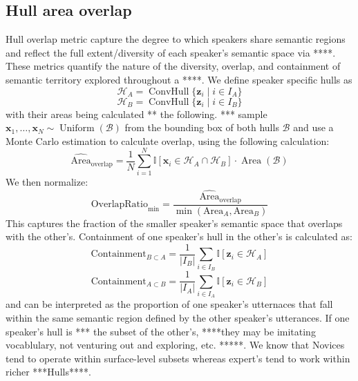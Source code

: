 \documentclass{article}
\theoremstyle{definition}
\numberwithin{table}{section}
\begin{document}
\subsection{Hull area overlap}

Hull overlap metric capture the degree to which speakers share semantic regions and reflect the full extent/diversity of each speaker's semantic space via ****. These metrics quantify the nature of the diversity, overlap, and containment of semantic territory explored throughout a ****. 
We define speaker specific hulls as 
\begin{equation}
    \mathcal{H}_A = \operatorname{ConvHull}\{\mathbf{z}_i \mid i \in I_A\}
\end{equation}
\begin{equation}
    \mathcal{H}_B = \operatorname{ConvHull}\{\mathbf{z}_i \mid i \in I_B\}
\end{equation}
with their areas being calculated ** the following. 
*** sample \begin{math}
    \mathbf{x}_1, \dots, \mathbf{x}_N \sim \operatorname{Uniform}(\mathcal{B})
\end{math} from the bounding box of both hulls $\mathcal{B}$ and use a Monte Carlo estimation to calculate overlap, using the following calculation:
\begin{equation}
\widehat{\text{Area}}_{\text{overlap}}
=
\frac{1}{N}
\sum_{i=1}^{N}
\mathbb{I}\!\left[
\mathbf{x}_i \in \mathcal{H}_A \cap \mathcal{H}_B
\right]
\cdot
\operatorname{Area}(\mathcal{B})
\end{equation}
We then normalize: 
\begin{equation}
    \text{OverlapRatio}_{\min}
=
\frac{
\widehat{\text{Area}}_{\text{overlap}}
}{
\min(\text{Area}_A, \text{Area}_B)
}
\end{equation}
This captures the fraction of the smaller speaker's semantic space that overlaps with the other's. Containment of one speaker's hull in the other's is calculated as: 
\begin{equation}
    \text{Containment}_{B \subset A}
=
\frac{1}{|I_B|}
\sum_{i \in I_B}
\mathbb{I}\!\left[
\mathbf{z}_i \in \mathcal{H}_A
\right]
\end{equation}
\begin{equation}
    \text{Containment}_{A \subset B}
=
\frac{1}{|I_A|}
\sum_{i \in I_A}
\mathbb{I}\!\left[
\mathbf{z}_i \in \mathcal{H}_B
\right]
\end{equation}
and can be interpreted as the proportion of one speaker's utternaces that fall within the same semantic region defined by the other speaker's utterances. If one speaker's hull is *** the subset of the other's, ****they may be imitating vocablulary, not venturing out and exploring, etc. *****. We know that Novices tend to operate within surface-level subsets whereas expert's tend to work within richer ***Hulls****. 
\end{document}
